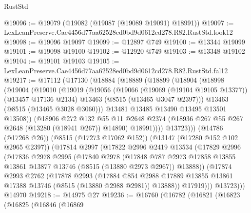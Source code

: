 \begin{lexlean}{RustStd}
\begin{coremodule}
@19096 := @19079 (@19082 (@19087 (@19089 @19091) @18991))
@19097 := LexLeanPreserve.Cae4456d77aa62528ed0bd9d0612cd278.R82.RustStd.look12
@19098 := @19096 @19097
@19099 := @12897 @749
@19100 := @13344 @19099
@19101 := @19098 @19100
@19102 := @12920 @749
@19103 := @13348 @19102
@19104 := @19101 @19103
@19105 := LexLeanPreserve.Cae4456d77aa62528ed0bd9d0612cd278.R82.RustStd.fal12
@19217 := @17112
    (@17130
      (@18884
        (@18889
          (@18899
            (@18904
              (@18998
                (@19004
                  (@19010
                    (@19019
                      (@19056
                        (@19066
                          (@19069 (@19104 @19105 @13377))
                          (@13457 @17136 @2134)
                          @13463
                          (@8515 (@13465 @3047 @2397)))
                        @13463
                        (@8515 (@13465 @3028 @3060)))
                      @13481
                      @13485
                      @13490
                      @13495
                      @13501
                      @13508))
                  (@18906
                    @272
                    @132
                    @55
                    @11
                    @2648
                    @2374
                    (@18936 @267 @55 @267 @2648 (@13280 (@18941 @267)) @14890)
                    @18991))))
            @13723)))
      (@14786 (@17268 @26))
      (@8515 (@17273 @17062 @152))
      (@13147 (@17280 @152 @102 @2965 @2397))
      (@17814
        @2997
        (@17822
          @2996
          @2419
          @13534
          (@17829
            @2996
            (@17836
              @2978
              @2995
              (@17840
                @2978
                (@17848
                  @787
                  @2973
                  @17858
                  @13855
                  @13861
                  @13877
                  @13746
                  (@8515 (@13880 @2973 @2967))
                  @13888))
              (@17874
                @2993
                @2762
                (@17878
                  @2993
                  (@17884
                    @854
                    @2988
                    @17889
                    @13855
                    @13861
                    @17388
                    @13746
                    (@8515 (@13880 @2988 @2981))
                    @13888))
                @17919)))
          @13723)))
    @14970
@19218 := @14975 @27
@19236 := @16760
    (@16782
      (@16821
        (@16823
          (@16825
            (@16846
              (@16869

\end{coremodule}
\end{lexlean}
